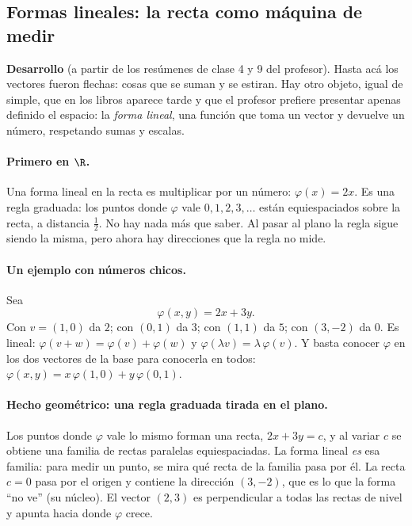 \subsection{Formas lineales: la recta como máquina de medir}\label{sec:formas-lineales}

{\small\vspace{1mm}\par}
{\small\vspace{1mm}\par}


\textbf{Desarrollo} (a partir de los resúmenes de clase 4 y 9 del profesor). Hasta acá los
vectores fueron flechas: cosas que se suman y se estiran. Hay otro objeto, igual de simple,
que en los libros aparece tarde y que el profesor prefiere presentar apenas definido el
espacio: la \emph{forma lineal}, una función que toma un vector y devuelve un número,
respetando sumas y escalas.

\paragraph{Primero en \(\R\).} Una forma lineal en la recta es multiplicar por un número:
\(\varphi(x)=2x\). Es una regla graduada: los puntos donde \(\varphi\) vale
\(0,1,2,3,\ldots\) están equiespaciados sobre la recta, a distancia \(\tfrac12\). No hay
nada más que saber. Al pasar al plano la regla sigue siendo la misma, pero ahora hay
direcciones que la regla no mide.

\paragraph{Un ejemplo con números chicos.} Sea
\[
  \varphi(x,y)=2x+3y .
\]
Con \(v=(1,0)\) da \(2\); con \((0,1)\) da \(3\); con \((1,1)\) da \(5\); con \((3,-2)\)
da \(0\). Es lineal: \(\varphi(v+w)=\varphi(v)+\varphi(w)\) y
\(\varphi(\lambda v)=\lambda\,\varphi(v)\). Y basta conocer \(\varphi\) en los dos vectores
de la base para conocerla en todos: \(\varphi(x,y)=x\,\varphi(1,0)+y\,\varphi(0,1)\).

\paragraph{Hecho geométrico: una regla graduada tirada en el plano.} Los puntos donde
\(\varphi\) vale lo mismo forman una recta, \(2x+3y=c\), y al variar \(c\) se obtiene una
familia de rectas paralelas equiespaciadas. La forma lineal \emph{es} esa familia: para
medir un punto, se mira qué recta de la familia pasa por él. La recta \(c=0\) pasa por el
origen y contiene la dirección \((3,-2)\), que es lo que la forma ``no ve'' (su núcleo).
El vector \((2,3)\) es perpendicular a todas las rectas de nivel y apunta hacia donde
\(\varphi\) crece.

